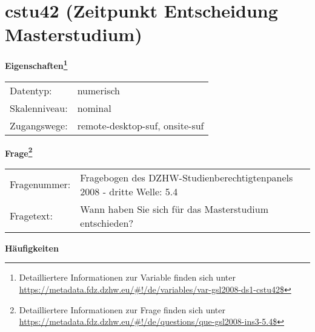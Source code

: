 
    \setcounter{footnote}{0}

    \vspace*{-1.8cm}
	\section{cstu42 (Zeitpunkt Entscheidung Masterstudium)}
	\label{section:cstu42}



    \vspace*{0.5cm}
    \noindent\textbf{Eigenschaften\footnote{Detailliertere Informationen zur Variable finden sich unter
		\url{https://metadata.fdz.dzhw.eu/\#!/de/variables/var-gsl2008-ds1-cstu42$}}}\\
	\begin{tabularx}{\hsize}{@{}lX}
	Datentyp: & numerisch \\
	Skalenniveau: & nominal \\
	Zugangswege: &
	  remote-desktop-suf, 
	  onsite-suf
 \\
    \end{tabularx}



				\vspace*{0.5cm}
                \noindent\textbf{Frage\footnote{Detailliertere Informationen zur Frage finden sich unter
		              \url{https://metadata.fdz.dzhw.eu/\#!/de/questions/que-gsl2008-ins3-5.4$}}}\\
				\begin{tabularx}{\hsize}{@{}lX}
					Fragenummer: &
					  Fragebogen des DZHW-Studienberechtigtenpanels 2008 - dritte Welle:
					  5.4
 \\
					Fragetext: & Wann haben Sie sich für das Masterstudium entschieden? \\
				\end{tabularx}





        		\vspace*{0.5cm}
                \noindent\textbf{Häufigkeiten}

